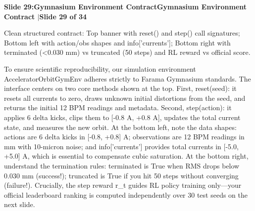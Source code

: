 \documentclass[11pt,a4paper]{article}
\begin{document}
\clearpage
\hypertarget{slide.29}{}
{}
\noindent\begin{tcolorbox}[colback=navy,colframe=navy,left=6pt,right=6pt,top=3pt,bottom=3pt,boxrule=0pt,arc=2pt]
{\large\bfseries\color{white}Slide 29:\enspace Gymnasium Environment Contract}\hfill{\footnotesize\bfseries\color{white!85!lightbg}Gymnasium Environment Contract \enspace$|$\enspace Slide 29 of 34}
\end{tcolorbox}
\vspace{0.2em}
\begin{tcolorbox}[colback=lightbg,colframe=bordergray,title={\footnotesize\bfseries\color{darkgray}Slide Visual Blueprint},fontupper=\small,left=6pt,right=6pt,top=2.5pt,bottom=2.5pt,boxrule=0.6pt,arc=2.5pt]
Clean structured contract: Top banner with reset() and step() call signatures; Bottom left with action/obs shapes and info['currents']; Bottom right with terminated (<0.030 mm) vs truncated (50 steps) and RL reward vs official score.
\end{tcolorbox}
\vspace{0.2em}
\begin{tcolorbox}[colback=white,colframe=primaryblue,title={\footnotesize\bfseries\color{white}Spoken Presenter Script},fontupper=\small,left=6pt,right=6pt,top=3pt,bottom=3pt,boxrule=0.8pt,arc=2.5pt]
To ensure scientific reproducibility, our simulation environment AcceleratorOrbitGymEnv adheres strictly to Farama Gymnasium standards. The interface centers on two core methods shown at the top. First, reset(seed): it resets all currents to zero, draws unknown initial distortions from the seed, and returns the initial 12 BPM readings and metadata. Second, step(action): it applies 6 delta kicks, clips them to [-0.8 A, +0.8 A], updates the total current state, and measures the new orbit. At the bottom left, note the data shapes: actions are 6 delta kicks in [-0.8, +0.8] A; observations are 12 BPM readings in mm with 10-micron noise; and info['currents'] provides total currents in [-5.0, +5.0] A, which is essential to compensate cubic saturation. At the bottom right, understand the termination rules: terminated is True when RMS drops below 0.030 mm (success!); truncated is True if you hit 50 steps without converging (failure!). Crucially, the step reward r\_t guides RL policy training only—your official leaderboard ranking is computed independently over 30 test seeds on the next slide.
\end{tcolorbox}
\vspace{0.2em}
\end{document}
